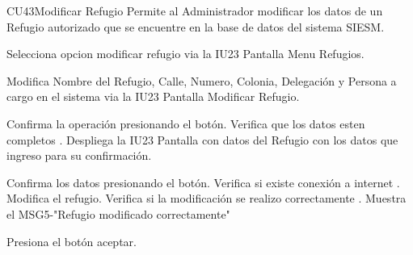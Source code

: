 \begin{UseCase}{CU43}{Modificar Refugio}{
		Permite al Administrador modificar los datos de un Refugio autorizado que se encuentre en la base de datos del sistema SIESM.\\
		
}
	
\end{UseCase}



\begin{UCtrayectoria}
	\item\UCactor Selecciona opcion modificar refugio via la IU23 Pantalla Menu Refugios.
	\item\UCactor Modifica Nombre del Refugio, Calle, Numero, Colonia, Delegación y Persona a cargo en el sistema via la IU23 Pantalla Modificar Refugio.
	\item\UCactor Confirma la operación presionando el botón.
	\UCpaso Verifica que los datos esten completos .
	\UCpaso Despliega la IU23 Pantalla con datos del Refugio con los datos que ingreso para su confirmación.
	\item\UCactor Confirma los datos presionando el botón.
	\UCpaso Verifica si existe conexión a internet .
	\UCpaso Modifica el refugio.
	\UCpaso Verifica si la modificación se realizo correctamente .
	\UCpaso Muestra el MSG5-"Refugio modificado correctamente"
	\item\UCactor Presiona el botón aceptar.
\end{UCtrayectoria}


